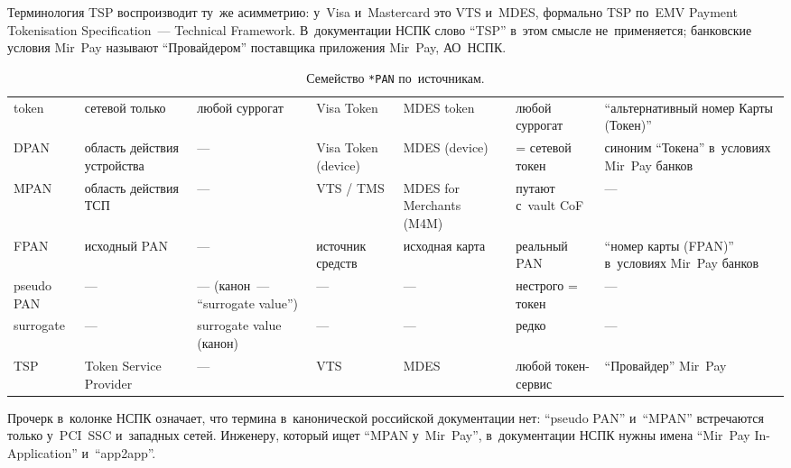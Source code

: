 Терминология TSP воспроизводит ту~же асимметрию: у~Visa и~Mastercard это VTS
и~MDES, формально TSP по~EMV Payment Tokenisation Specification~--- Technical
Framework. В~документации НСПК слово \enquote{TSP} в~этом смысле
не~применяется; банковские условия Mir~Pay называют
\enquote{Провайдером} поставщика приложения Mir~Pay, АО~НСПК.

\begin{table}[tbp]
  \caption{Семейство \texttt{*PAN} по~источникам.}\label{tab:token-terminology}
  \begingroup
  \tablesetup
  \setlength{\tabcolsep}{3pt}
  \begin{tabularx}{\textwidth}{
      @{}P{0.12\textwidth}
      Y Y Y Y Y Y@{}
    }
    \toprule
    \headrow
     &  &  &  &
     &  &  \\
    \midrule
    token       & сетевой только & любой суррогат & Visa Token & MDES token & любой суррогат & \enquote{альтернативный номер Карты (Токен)} \\
    \rowsep
    DPAN        & область действия устройства & --- & Visa Token (device) & MDES (device) & = сетевой токен & синоним \enquote{Токена} в~условиях Mir~Pay банков \\
    \rowsep
    MPAN        & область действия ТСП & --- & VTS / TMS & MDES for Merchants (M4M) & путают с~vault CoF & --- \\
    \rowsep
    FPAN        & исходный PAN & --- & источник средств & исходная карта & реальный PAN & \enquote{номер карты (FPAN)} в~условиях Mir~Pay банков \\
    \rowsep
    pseudo PAN  & --- & --- (канон~--- \enquote{surrogate value}) & --- & --- & нестрого = токен & --- \\
    \rowsep
    surrogate   & --- & surrogate value (канон) & --- & --- & редко & --- \\
    \rowsep
    TSP         & Token Service Provider & --- & VTS & MDES & любой токен-сервис & \enquote{Провайдер} Mir~Pay \\
    \bottomrule
  \end{tabularx}\par
  \endgroup
\end{table}

Прочерк в~колонке НСПК означает, что термина в~канонической российской
документации нет: \enquote{pseudo PAN} и~\enquote{MPAN} встречаются только у~PCI~SSC
и~западных сетей. Инженеру, который ищет \enquote{MPAN у~Mir~Pay}, в~документации
НСПК нужны имена \enquote{Mir~Pay In-Application} и~\enquote{app2app}.


